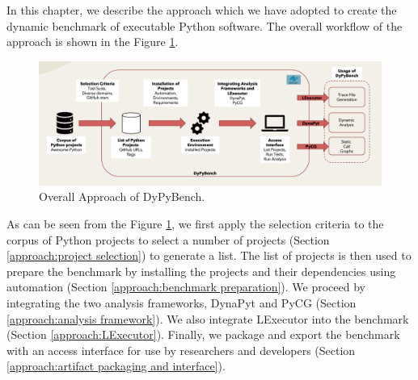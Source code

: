 In this chapter, we describe the approach which we have adopted to create the dynamic benchmark of executable Python software.
The overall workflow of the approach is shown in the Figure \ref{fig:overall_approach}.

\begin{figure}[ht]
\centering
\includegraphics[width=1\linewidth]{figures/approach/DyPyBench3.png}
\caption[Approach]{\label{fig:overall_approach}Overall Approach of DyPyBench.}
\end{figure}

As can be seen from the Figure \ref{fig:overall_approach}, we first apply the selection criteria to the corpus of Python projects to select a number of projects (Section \ref{approach:project selection}) to generate a list.
The list of projects is then used to prepare the benchmark by installing the projects and their dependencies using automation (Section \ref{approach:benchmark preparation}).
We proceed by integrating the two analysis frameworks, DynaPyt and PyCG (Section \ref{approach:analysis framework}). 
We also integrate LExecutor into the benchmark (Section \ref{approach:LExecutor}).
Finally, we package and export the benchmark with an access interface for use by researchers and developers (Section \ref{approach:artifact packaging and interface}).   

